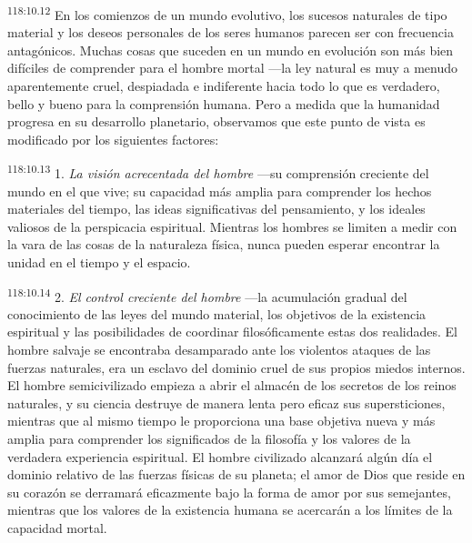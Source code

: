 \par
\textsuperscript{118:10.12} En los comienzos de un mundo evolutivo, los sucesos naturales de tipo material y los deseos personales de los seres humanos parecen ser con frecuencia antagónicos. Muchas cosas que suceden en un mundo en evolución son más bien difíciles de comprender para el hombre mortal ---la ley natural es muy a menudo aparentemente cruel, despiadada e indiferente hacia todo lo que es verdadero, bello y bueno para la comprensión humana. Pero a medida que la humanidad progresa en su desarrollo planetario, observamos que este punto de vista es modificado por los siguientes factores:

\par
\textsuperscript{118:10.13} 1. \textit{La visión acrecentada del hombre} ---su comprensión creciente del mundo en el que vive; su capacidad más amplia para comprender los hechos materiales del tiempo, las ideas significativas del pensamiento, y los ideales valiosos de la perspicacia espiritual. Mientras los hombres se limiten a medir con la vara de las cosas de la naturaleza física, nunca pueden esperar encontrar la unidad en el tiempo y el espacio.

\par
\textsuperscript{118:10.14} 2. \textit{El control creciente del hombre} ---la acumulación gradual del conocimiento de las leyes del mundo material, los objetivos de la existencia espiritual y las posibilidades de coordinar filosóficamente estas dos realidades. El hombre salvaje se encontraba desamparado ante los violentos ataques de las fuerzas naturales, era un esclavo del dominio cruel de sus propios miedos internos. El hombre semicivilizado empieza a abrir el almacén de los secretos de los reinos naturales, y su ciencia destruye de manera lenta pero eficaz sus supersticiones, mientras que al mismo tiempo le proporciona una base objetiva nueva y más amplia para comprender los significados de la filosofía y los valores de la verdadera experiencia espiritual. El hombre civilizado alcanzará algún día el dominio relativo de las fuerzas físicas de su planeta; el amor de Dios que reside en su corazón se derramará eficazmente bajo la forma de amor por sus semejantes, mientras que los valores de la existencia humana se acercarán a los límites de la capacidad mortal.

